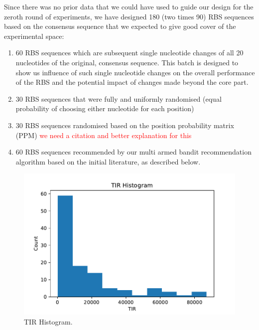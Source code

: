 \documentclass{article}
\begin{document}
Since there was no prior data that we could have used to guide our design for the zeroth round of experiments, we have designed 180 (two times 90) RBS sequences based on the consensus sequence that we expected to give good cover of the experimental space: 

\begin{enumerate}
    \item 60 RBS sequences which are subsequent single nucleotide changes of all 20 nucleotides of the original, consensus sequence. This batch is designed to show us influence of such single nucleotide changes on the overall performance of the RBS and the potential impact of changes made beyond the core part.
    \item 30 RBS sequences that were fully and uniformly randomised (equal probability of choosing either nucleotide for each position) 
    \item 30 RBS sequences randomised based on the position probability matrix (PPM) \textcolor{red}{we need a citation and better explanation for this}  
    \item 60 RBS sequences recommended by our multi armed bandit recommendation algorithm based on the initial literature, as described below.
\end{enumerate}{}

\begin{figure}[t]
    \centering
    \includegraphics[scale=0.7]{plots/TIR_histogram.pdf}
    \caption{TIR Histogram.}
    \label{fig: TIR Histogram.}
\end{figure}
\end{document}

